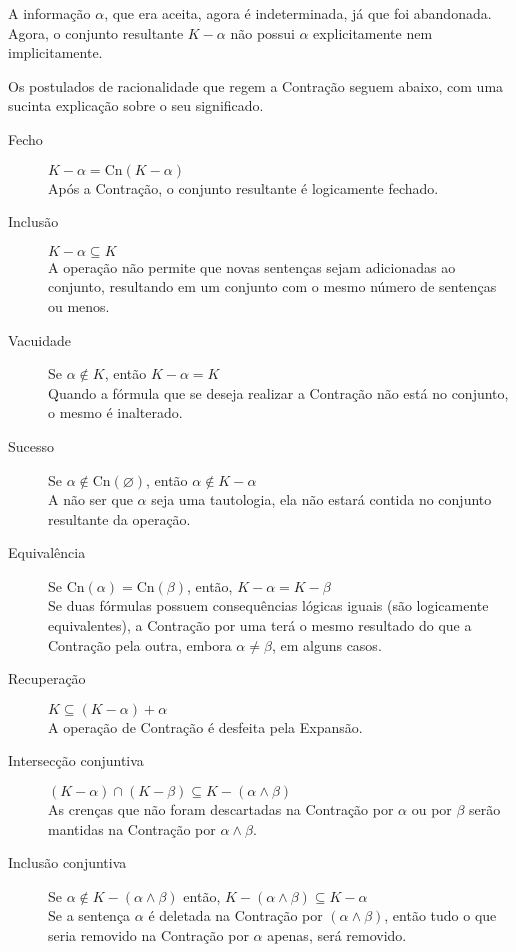 A informação $ \alpha $, que era aceita, agora é indeterminada, já que foi abandonada. Agora, o conjunto resultante $ K - \alpha $ não possui $ \alpha $ explicitamente nem implicitamente. 

Os postulados de racionalidade que regem a Contração seguem abaixo, com uma sucinta explicação sobre o seu significado.

\begin{description}
	\item[Fecho] $ K - \alpha = \text{Cn}(K - \alpha) $ \\ Após a Contração, o conjunto resultante é logicamente fechado.
	\item[Inclusão] $ K - \alpha \subseteq K$ \\ A operação não permite que novas sentenças sejam adicionadas ao conjunto, resultando em um conjunto com o mesmo número de sentenças ou menos.
	\item[Vacuidade] Se $ \alpha \notin K $, então $ K - \alpha = K $ \\ Quando a fórmula que se deseja realizar a Contração não está no conjunto, o mesmo é inalterado.
	\item[Sucesso] Se $ \alpha \notin \text{Cn}(\varnothing) $, então $ \alpha \notin K - \alpha $ \\ A não ser que $ \alpha $ seja uma tautologia, ela não estará contida no conjunto resultante da operação.
	\item[Equivalência] Se $ \text{Cn}(\alpha) = \text{Cn}(\beta) $, então, $ K - \alpha = K - \beta $ \\ Se duas fórmulas possuem consequências lógicas iguais (são logicamente equivalentes), a Contração por uma terá o mesmo resultado do que a Contração pela outra, embora $ \alpha \neq \beta $, em alguns casos.
	\item[Recuperação] $ K \subseteq (K - \alpha) + \alpha $ \\ A operação de Contração é desfeita pela Expansão.
	\item[Intersecção conjuntiva] $ (K - \alpha) \cap (K - \beta) \subseteq K - (\alpha \land \beta) $ \\ As crenças que não foram descartadas na Contração por $ \alpha $ ou por $ \beta $ serão mantidas na Contração por $ \alpha \land \beta $.
	\item[Inclusão conjuntiva] Se $ \alpha \notin K - (\alpha \land \beta) $ então, $ K - (\alpha \land \beta) \subseteq K - \alpha $ \\ Se a sentença $ \alpha $ é deletada na Contração por $  (\alpha \land \beta) $, então tudo o que seria removido na Contração por $ \alpha $ apenas, será removido. 
\end{description}

